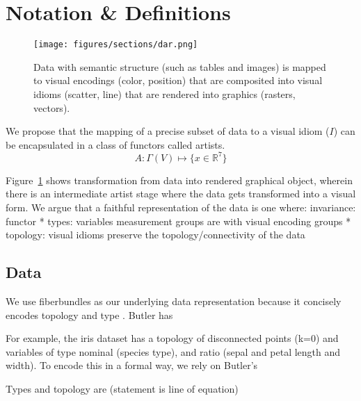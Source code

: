 \documentclass[../intro.tex]{subfiles}
\begin{document}
\section{Notation \& Definitions}
\begin{figure}
    \texttt{[image: figures/sections/dar.png]}
    \caption{Data with semantic structure (such as tables and images) is mapped to visual encodings (color, position) that are composited into visual idioms (scatter, line) that are rendered into graphics (rasters, vectors).}
    \label{fig:artists}
\end{figure}
We propose that the mapping of a precise subset of data to a visual idiom ($I$) can be encapsulated in a class of functors called artists.
\begin{equation}
    A: \Gamma(V) \mapsto \{x \in \mathbb{R}^{7}\}
\end{equation}

Figure~\ref{fig:artists} shows transformation from data into rendered graphical object, wherein there is an intermediate artist stage where the data gets transformed into a visual form. We argue that a faithful representation of the data is one where:
invariance:
functor
* types: variables measurement groups are  with visual encoding groups
* topology: visual idioms preserve the topology/connectivity of the data

\subsection{Data}
We use fiberbundles as our underlying data representation because it concisely encodes topology\cite{butlerVectorBundleClassesForm1992,butlerVisualizationModelBased1989} and type \cite{spivakSIMPLICIALDATABASES}. Butler has 



For example, the iris dataset \cite{UCIMachineLearning} has a topology of disconnected points (k=0) and variables of type nominal (species type), and ratio (sepal and petal length and width). To encode this in a formal way, we rely on Butler's 

Types and topology are (statement is line of equation)
\end{document}
